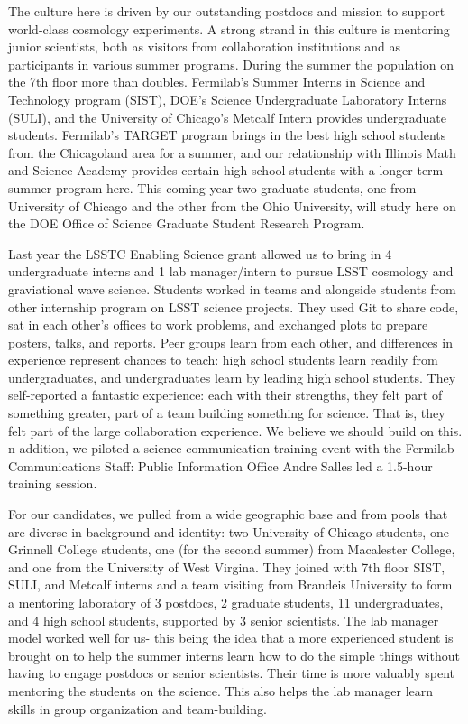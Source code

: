 The culture here is driven by our outstanding postdocs and mission to support
world-class cosmology experiments. A strong strand in this culture is mentoring
junior scientists, both  as visitors from collaboration institutions and as participants
in various summer programs.
During the summer the population on the 7th floor more than doubles.
Fermilab's Summer Interns in Science and Technology program (SIST),
DOE's Science Undergraduate Laboratory Interns (SULI), and the University of
Chicago's Metcalf Intern provides undergraduate students. 
Fermilab's TARGET program brings in the best high school 
students from the Chicagoland area for a summer, 
and our relationship with Illinois Math and Science Academy provides
certain high school students with a longer term summer program here.
This coming year two graduate students, one from University of Chicago and the
other from the Ohio University, will study here on the DOE Office of Science
Graduate Student Research Program.

Last year the LSSTC Enabling Science grant allowed us to bring in
4 undergraduate interns and 1 lab manager/intern to pursue LSST
cosmology and graviational wave science. 
Students worked in teams and alongside students from other internship program on LSST science projects. 
They used Git to share code, sat in each other's offices to work problems, and exchanged plots to prepare posters, talks, and reports. 
Peer groups learn from each other,
and differences in experience represent chances to teach: high school
students learn readily from undergraduates, and undergraduates learn
by leading high school students. 
They self-reported a fantastic experience: each with their strengths,
they felt part of something greater, part of a team building something 
for science. That is, they felt part of the large collaboration experience.
We believe we should build on this.
n addition, we piloted a science communication training event with the Fermilab Communications Staff: Public Information Office Andre Salles led a 1.5-hour training session.

For our candidates, we pulled from a wide geographic base and from pools that are diverse in background and identity:
two University of Chicago students, one Grinnell College students, 
one (for the second summer) from Macalester College, and
one from the University of West Virgina. They joined with 7th floor SIST, SULI,
and Metcalf interns and a team visiting from Brandeis University to form
a mentoring laboratory of 3 postdocs, 2 graduate students, 11 undergraduates, and 4
high school students,
supported by 3 senior scientists. The lab manager model worked well for us- this
being the idea that a more experienced student is brought on to help the summer interns
learn how to do the simple things without having to engage postdocs or senior scientists. 
Their time is more valuably spent mentoring the students on the science. 
This also helps the lab manager learn skills in group organization and team-building.

